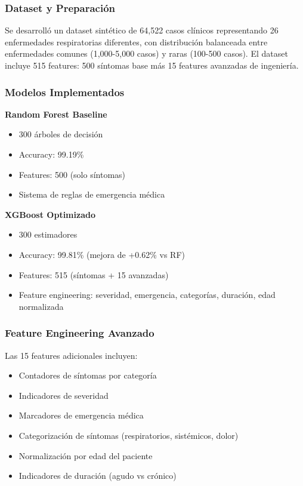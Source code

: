 \documentclass[12pt,a4paper]{article}
\begin{document}
\subsubsection{Dataset y Preparación}

Se desarrolló un dataset sintético de 64,522 casos clínicos representando 26 enfermedades respiratorias diferentes, con distribución balanceada entre enfermedades comunes (1,000-5,000 casos) y raras (100-500 casos). El dataset incluye 515 features: 500 síntomas base más 15 features avanzadas de ingeniería.

\subsubsection{Modelos Implementados}

\textbf{Random Forest Baseline}
\begin{itemize}
    \item 300 árboles de decisión
    \item Accuracy: 99.19\%
    \item Features: 500 (solo síntomas)
    \item Sistema de reglas de emergencia médica
\end{itemize}

\textbf{XGBoost Optimizado}
\begin{itemize}
    \item 300 estimadores
    \item Accuracy: 99.81\% (mejora de +0.62\% vs RF)
    \item Features: 515 (síntomas + 15 avanzadas)
    \item Feature engineering: severidad, emergencia, categorías, duración, edad normalizada
\end{itemize}

\subsubsection{Feature Engineering Avanzado}

Las 15 features adicionales incluyen:
\begin{itemize}
    \item Contadores de síntomas por categoría
    \item Indicadores de severidad
    \item Marcadores de emergencia médica
    \item Categorización de síntomas (respiratorios, sistémicos, dolor)
    \item Normalización por edad del paciente
    \item Indicadores de duración (agudo vs crónico)
\end{itemize}
\end{document}
